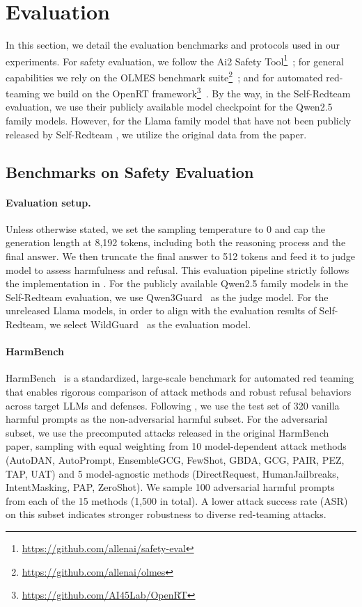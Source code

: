 \documentclass[11pt, letterpaper]{template}
\theoremstyle{plain}
\theoremstyle{definition}
\theoremstyle{remark}
\begin{document}
\newpage
\section{Evaluation} \label{apd:evaluation}
In this section, we detail the evaluation benchmarks and protocols used in our experiments. For safety evaluation, we follow the Ai2 Safety Tool\footnote{\url{https://github.com/allenai/safety-eval}}~\citep{han2024wildguard,jiang2024wildteaming}; for general capabilities we rely on the OLMES benchmark suite\footnote{\url{https://github.com/allenai/olmes}}~\citep{gu2025olmes}; and for automated red-teaming we build on the OpenRT framework\footnote{\url{https://github.com/AI45Lab/OpenRT}}~\citep{OpenRT2026}. 
By the way, in the Self-Redteam evaluation, we use their publicly available model checkpoint for the Qwen2.5 family models. However, for the Llama family model that have not been publicly released by Self-Redteam , we utilize the original data from the paper.
\subsection{Benchmarks on Safety Evaluation} \label{apx:safety_bench}

\paragraph{Evaluation setup.} Unless otherwise stated, we set the sampling temperature to 0 and cap the generation length at 8,192 tokens, including both the reasoning process and the final answer. We then truncate the final answer to 512 tokens and feed it to judge model to assess harmfulness and refusal. This evaluation pipeline strictly follows the implementation in \citet{liu2025chasing}. For the publicly available Qwen2.5 family models in the Self-Redteam evaluation, we use Qwen3Guard~\citep{zhao2025qwen3guard} as the judge model. For the unreleased Llama models, in order to align with the evaluation results of Self-Redteam\cite{liu2025chasing}, we select WildGuard~\citep{han2024wildguard} as the evaluation model.

\paragraph{HarmBench} HarmBench~\citep{mazeika2024harmbench} is a standardized, large-scale benchmark for automated red teaming that enables rigorous comparison of attack methods and robust refusal behaviors across target LLMs and defenses. Following \citet{liu2025chasing}, we use the test set of 320 vanilla harmful prompts as the non-adversarial harmful subset. For the adversarial subset, we use the precomputed attacks released in the original HarmBench paper, sampling with equal weighting from 10 model-dependent attack methods (AutoDAN, AutoPrompt, EnsembleGCG, FewShot, GBDA, GCG, PAIR, PEZ, TAP, UAT) and 5 model-agnostic methods (DirectRequest, HumanJailbreaks, IntentMasking, PAP, ZeroShot). We sample 100 adversarial harmful prompts from each of the 15 methods (1,500 in total). A lower attack success rate (ASR) on this subset indicates stronger robustness to diverse red-teaming attacks.
\end{document}
